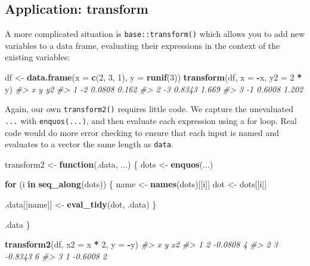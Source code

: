 \documentclass[]{book}
\makeatletter
\newenvironment{Shaded}{\begin{snugshade}}{\end{snugshade}}
\newcommand{\CommentTok}[1]{\textcolor[rgb]{0.37,0.37,0.37}{\textit{#1}}}
\newcommand{\ControlFlowTok}[1]{\textcolor[rgb]{0.27,0.27,0.27}{\textbf{#1}}}
\newcommand{\DataTypeTok}[1]{\textcolor[rgb]{0.27,0.27,0.27}{#1}}
\newcommand{\DecValTok}[1]{\textcolor[rgb]{0.06,0.06,0.06}{#1}}
\newcommand{\KeywordTok}[1]{\textcolor[rgb]{0.27,0.27,0.27}{\textbf{#1}}}
\newcommand{\NormalTok}[1]{#1}
\newcommand{\OperatorTok}[1]{\textcolor[rgb]{0.43,0.43,0.43}{\textbf{#1}}}
\newcommand{\StringTok}[1]{\textcolor[rgb]{0.5,0.5,0.5}{#1}}
\newcommand{\indexc}[1]{\index{#1@\texttt{#1}}}
\makeatother
\begin{document}
\hypertarget{application-transform}{%
\subsection{Application: transform}\label{application-transform}}

\indexc{transform()}

A more complicated situation is \texttt{base::transform()} which allows you to add new variables to a data frame, evaluating their expressions in the context of the existing variables:

\begin{Shaded}
\begin{Highlighting}[]
\NormalTok{df <-}\StringTok{ }\KeywordTok{data.frame}\NormalTok{(}\DataTypeTok{x =} \KeywordTok{c}\NormalTok{(}\DecValTok{2}\NormalTok{, }\DecValTok{3}\NormalTok{, }\DecValTok{1}\NormalTok{), }\DataTypeTok{y =} \KeywordTok{runif}\NormalTok{(}\DecValTok{3}\NormalTok{))}
\KeywordTok{transform}\NormalTok{(df, }\DataTypeTok{x =} \OperatorTok{-}\NormalTok{x, }\DataTypeTok{y2 =} \DecValTok{2} \OperatorTok{*}\StringTok{ }\NormalTok{y)}
\CommentTok{#>    x      y    y2}
\CommentTok{#> 1 -2 0.0808 0.162}
\CommentTok{#> 2 -3 0.8343 1.669}
\CommentTok{#> 3 -1 0.6008 1.202}
\end{Highlighting}
\end{Shaded}

Again, our own \texttt{transform2()} requires little code. We capture the unevaluated \texttt{...} with \texttt{enquos(...)}, and then evaluate each expression using a for loop. Real code would do more error checking to ensure that each input is named and evaluates to a vector the same length as \texttt{data}.

\begin{Shaded}
\begin{Highlighting}[]
\NormalTok{transform2 <-}\StringTok{ }\ControlFlowTok{function}\NormalTok{(.data, ...) \{}
\NormalTok{  dots <-}\StringTok{ }\KeywordTok{enquos}\NormalTok{(...)}

  \ControlFlowTok{for}\NormalTok{ (i }\ControlFlowTok{in} \KeywordTok{seq_along}\NormalTok{(dots)) \{}
\NormalTok{    name <-}\StringTok{ }\KeywordTok{names}\NormalTok{(dots)[[i]]}
\NormalTok{    dot <-}\StringTok{ }\NormalTok{dots[[i]]}

\NormalTok{    .data[[name]] <-}\StringTok{ }\KeywordTok{eval_tidy}\NormalTok{(dot, .data)}
\NormalTok{  \}}

\NormalTok{  .data}
\NormalTok{\}}

\KeywordTok{transform2}\NormalTok{(df, }\DataTypeTok{x2 =}\NormalTok{ x }\OperatorTok{*}\StringTok{ }\DecValTok{2}\NormalTok{, }\DataTypeTok{y =} \OperatorTok{-}\NormalTok{y)}
\CommentTok{#>   x       y x2}
\CommentTok{#> 1 2 -0.0808  4}
\CommentTok{#> 2 3 -0.8343  6}
\CommentTok{#> 3 1 -0.6008  2}
\end{Highlighting}
\end{Shaded}
\end{document}
